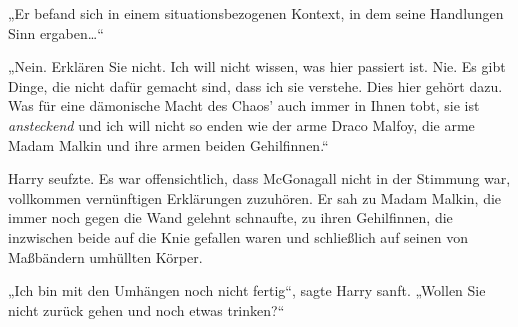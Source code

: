 „Er befand sich in einem situationsbezogenen Kontext, in dem seine Handlungen Sinn ergaben…“

„Nein. Erklären Sie nicht. Ich will nicht wissen, was hier passiert ist. Nie. Es gibt Dinge, die nicht dafür gemacht sind, dass ich sie verstehe. Dies hier gehört dazu. Was für eine dämonische Macht des Chaos’ auch immer in Ihnen tobt, sie ist \emph{ansteckend} und ich will nicht so enden wie der arme Draco Malfoy, die arme Madam Malkin und ihre armen beiden Gehilfinnen.“

Harry seufzte. Es war offensichtlich, dass McGonagall nicht in der Stimmung war, vollkommen vernünftigen Erklärungen zuzuhören. Er sah zu Madam Malkin, die immer noch gegen die Wand gelehnt schnaufte, zu ihren Gehilfinnen, die inzwischen beide auf die Knie gefallen waren und schließlich auf seinen von Maßbändern umhüllten Körper.

„Ich bin mit den Umhängen noch nicht fertig“, sagte Harry sanft. „Wollen Sie nicht zurück gehen und noch etwas trinken?“

